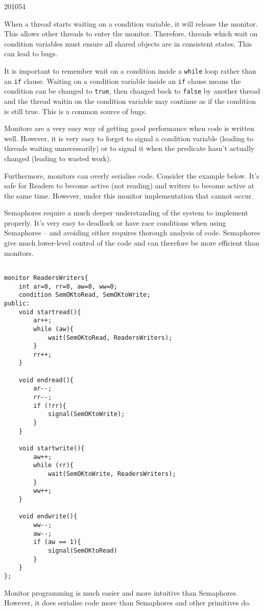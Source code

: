 \documentclass[10pt,\jkfside,a4paper]{article}
\begin{document}
\begin{examquestion}{2010}{5}{4}
\begin{enumerate}[label=(\alph*)]
When a thread starts waiting on a condition variable, it will release the
monitor. This allows other threads to enter the monitor. Therefore, threads
which wait on condition variables must ensure all shared objects are in
consistent states. This can lead to bugs.

It is important to remember wait on a condition inside a \texttt{while} loop
rather than an \texttt{if} clause. Waiting on a condition variable inside an
\texttt{if} clause means the condition can be changed to \texttt{true},
then changed back to \texttt{false} by another thread and the thread waitin
on the condition variable may continue as if the condition is still true.
This is a common source of bugs.

Monitors are a very easy way of getting good performance when code is
written well. However, it is very easy to forget to signal a condition
variable (leading to threads waiting unnecessarily) or to signal it when the
predicate hasn't actually changed (leading to wasted work).

Furthermore, monitors can overly serialise code. Consider the example below.
It's safe for Readers to become active (not reading) and writers to become
active at the same time. However, under this monitor implementation that
cannot occur.

Semaphores require a much deeper understanding of the system to
implement properly. It's very easy to deadlock or have race conditions when
using Semaphores -- and avoiding either requires thorough analysis of code.
Semaphores give much lower-level control of the code and can therefore be
more efficient than monitors.

\begin{lstlisting}

monitor ReadersWriters{
	int ar=0, rr=0, aw=0, ww=0;
	condition SemOKtoRead, SemOKtoWrite;
public:
	void startread(){
		ar++;
		while (aw){
			wait(SemOKtoRead, ReadersWriters);
		}
		rr++;
	}

	void endread(){
		ar--;
		rr--;
		if (!rr){
			signal(SemOKtoWrite);
		}
	}

	void startwrite(){
		aw++;
		while (rr){
			wait(SemOKtoWrite, ReadersWriters);
		}
		ww++;
	}

	void endwrite(){
		ww--;
		aw--;
		if (aw == 1){
			signal(SemOKtoRead)
		}
	}
};

\end{lstlisting}

\iffalse

Monitor programming is much easier and more intuitive than Semaphores.
However, it does serialise code more than Semaphores and other primitives do.


\end{enumerate}
\end{examquestion}
\end{document}
